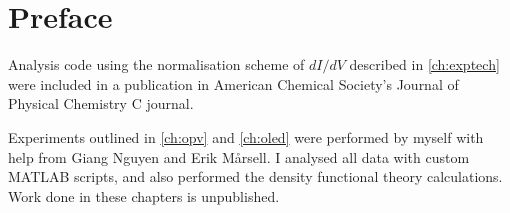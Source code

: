 
\chapter{Preface}

Analysis code using the normalisation scheme of $dI/dV$ described in \autoref{ch:exptech} were included in a publication in American Chemical Society's Journal of Physical Chemistry C journal.

Experiments outlined in \autoref{ch:opv} and \autoref{ch:oled} were performed by myself with help from Giang Nguyen and Erik M\aa rsell. I analysed all data with custom MATLAB scripts, and also performed the density functional theory calculations. Work done in these chapters is unpublished.
